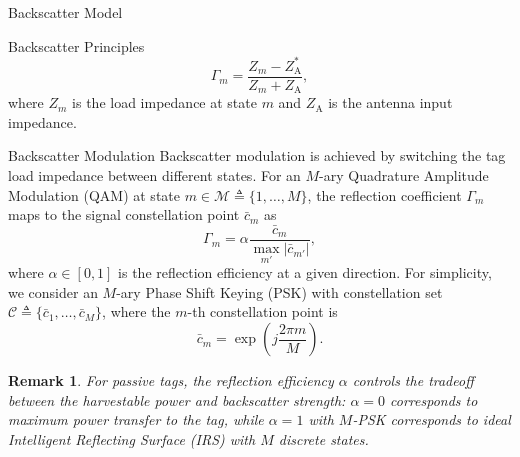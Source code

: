 \documentclass[journal]{IEEEtran}
\newtheorem{remark}{Remark}
\begin{document}
\begin{section}{Backscatter Model}
\begin{subsection}{Backscatter Principles}
			\begin{equation}
				\Gamma_m = \frac{Z_m - Z_{\mathrm{A}}^*}{Z_m + Z_{\mathrm{A}}},
				\label{eq:reflection_coefficient}
			\end{equation}
			where $Z_m$ is the load impedance at state $m$ and $Z_{\mathrm{A}}$ is the antenna input impedance.
		\end{subsection}

		\begin{subsection}{Backscatter Modulation}
			Backscatter modulation is achieved by switching the tag load impedance between different states. For an $M$-ary Quadrature Amplitude Modulation (QAM) at state $m \in \mathcal{M} \triangleq \{1,\ldots,M\}$, the reflection coefficient $\Gamma_m$ maps to the signal constellation point $\bar{c}_m$ as \cite{Thomas2012a}
			\begin{equation}
				\Gamma_m = \alpha \frac{\bar{c}_m}{\max_{m'} \lvert \bar{c}_{m'} \rvert},
				\label{eq:backscatter_modulation}
			\end{equation}
			where $\alpha \in [0,1]$ is the reflection efficiency at a given direction. For simplicity, we consider an $M$-ary Phase Shift Keying (PSK) with constellation set $\mathcal{C} \triangleq \{\bar{c}_1,\ldots,\bar{c}_M\}$, where the $m$-th constellation point is
			\begin{equation}
				\bar{c}_m = \exp \left(j \frac{2 \pi m}{M}\right).
				\label{eq:mpsk}
			\end{equation}

			\begin{remark}
				For passive tags, the reflection efficiency $\alpha$ controls the tradeoff between the harvestable power and backscatter strength: $\alpha = 0$ corresponds to maximum power transfer to the tag, while $\alpha = 1$ with $M$-PSK corresponds to ideal Intelligent Reflecting Surface (IRS) with $M$ discrete states.
			\end{remark}
		\end{subsection}
	\end{section}
\end{document}
